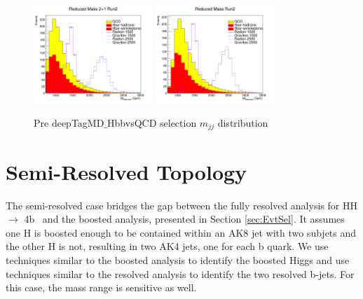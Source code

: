 \begin{figure}[!htb]
	\centering
	\includegraphics[width=0.4\textwidth]{Figures/mred21_Run2_deepTagMD_HbbvsQCD.png}
	\includegraphics[width=0.4\textwidth]{Figures/mredTT_Run2_deepTagMD_HbbvsQCD.png}
	\caption{Pre deepTagMD$\_$HbbvsQCD selection $m_{jj}$ distribution}
	\label{fig:preMred}
\end{figure}

\section{Semi-Resolved Topology\label{app:2p1}}

The semi-resolved case bridges the gap between the fully resolved analysis for HH $\rightarrow$ 4b~\cite{CMS_AN_2015-108} and the boosted analysis, presented in Section \ref{sec:EvtSel}. It assumes one H is boosted enough to be contained within an AK8 jet with two subjets and the other H is not, resulting in two AK4 jets, one for each b quark. We use techniques similar to the boosted analysis to identify the boosted Higgs and use techniques similar to the resolved analysis to identify the two resolved b-jets. For this case, the mass range is sensitive as well.

